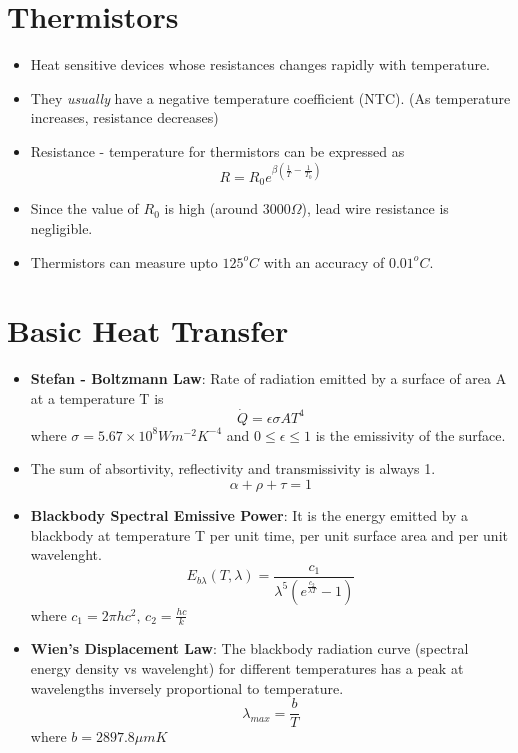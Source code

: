 \documentclass{article}
\begin{document}
\section{Thermistors}
	\begin{itemize}
		\item Heat sensitive devices whose resistances changes rapidly with temperature. 
		\item They \textit{usually} have a negative temperature coefficient (NTC). (As temperature increases, resistance decreases) 
		\item Resistance - temperature for thermistors can be expressed as
		\[R = R_0 e^{\beta(\frac{1}{T}-\frac{1}{T_0})}\]
		\item Since the value of $R_0$ is high (around $3000\Omega$), lead wire resistance is negligible.
		\item Thermistors can measure upto $125^{o}C$ with an accuracy of $0.01^{o}C$. 
	\end{itemize}

\section{Basic Heat Transfer}
	\begin{itemize}
		\item \textbf{Stefan - Boltzmann Law}: Rate of radiation emitted by a surface of area A at a temperature T is 
		\[\dot{Q} = \epsilon \sigma A T^4\]
		where $\sigma = 5.67 \times 10^8 Wm^{-2}K^{-4}$ and $ 0 \leq \epsilon\leq 1$ is the emissivity of the surface.
		\item The sum of absortivity, reflectivity and transmissivity is always 1.
		\[\alpha + \rho + \tau =1\]
		\item \textbf{Blackbody Spectral Emissive Power}: It is the energy emitted by a blackbody at temperature T per unit time, per unit surface area  and per unit wavelenght. 
		\[\boxed{E_{b\lambda}(T, \lambda) = \frac{c_1}{\lambda^5 (e^{\frac{c_2}{\lambda T}}-1)}} \] 
		where $c_1 = 2\pi h c^2$, $c_2 = \frac{hc}{k}$
		\item \textbf{Wien's Displacement Law}: The blackbody radiation curve (spectral energy density vs wavelenght) for different temperatures has a peak at wavelengths inversely proportional to temperature. 
		\[\lambda_{max} = \frac{b}{T}\]
		where $b= 2897.8 \mu mK$
	\end{itemize}
\end{document}
